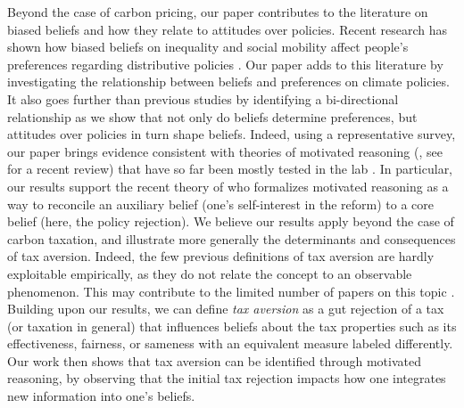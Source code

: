 \documentclass[12pt]{article} %
\begin{document}

Beyond the case of carbon pricing, our paper contributes to the literature on biased beliefs and how they relate to attitudes over policies. Recent research has shown how biased beliefs on inequality and social mobility affect people's preferences regarding distributive policies \citep[e.g.][]{cruces_et_al_2013,kuziemko_et_al_2015,alesina_intergenerational_2018}. Our paper adds to this literature by investigating the relationship between beliefs and preferences on climate policies. It also goes further than previous studies by identifying a bi-directional relationship as we show that not only do beliefs determine preferences, but attitudes over policies in turn shape beliefs. Indeed, using a representative survey, our paper brings evidence consistent with theories of motivated reasoning (\citet{ziva_kunda_case_1990}, see \citet{benabou_mindful_2016} for a recent review) that have so far been mostly tested in the lab \citep[e.g.][]{redlawsk_hot_2002,thaler_2019}. In particular, our results support the recent theory of \citet{little_distortion_2019} who formalizes motivated reasoning as a way to reconcile an auxiliary belief (one's self-interest in the reform) to a core belief (here, the policy rejection). We believe our results apply beyond the case of carbon taxation, and illustrate more generally the determinants and consequences of tax aversion. Indeed, the few previous definitions of tax aversion \citep{sussman_axe_2011} are hardly exploitable empirically, as they do not relate the concept to an observable phenomenon. This may contribute to the limited number of papers on this topic \citep{kallbekken_et_al_2011,kessler_tax_2016}. Building upon our results, we can define \textit{tax aversion} as a gut rejection of a tax (or taxation in general) that influences beliefs about the tax properties such as its effectiveness, fairness, or sameness with an equivalent measure labeled differently. Our work then shows that tax aversion can be identified through motivated reasoning, by observing that the initial tax rejection impacts how one integrates new information into one's beliefs.


\end{document}
